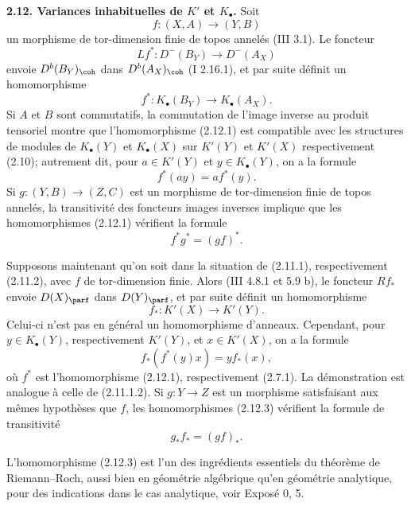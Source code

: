 \documentclass[11pt]{article}
\begin{document}
\textbf{2.12. Variances inhabituelles de \(K'\) et \(K_{\bullet}\).} Soit
\[
 f:(X,A)\longrightarrow(Y,B)
\]
un morphisme de tor-dimension finie de topos annelés (III 3.1). Le foncteur
\[
 Lf^*:D^-(B_Y)\longrightarrow D^-(A_X)
\]
envoie \(D^b(B_Y)_{\coh}\) dans \(D^b(A_X)_{\coh}\) (I 2.16.1), et par suite définit un homomorphisme
\begin{equation}\tag{2.12.1}
 f^*:K_{\bullet}(B_Y)\longrightarrow K_{\bullet}(A_X).
\end{equation}
Si \(A\) et \(B\) sont commutatifs, la commutation de l'image inverse au produit tensoriel montre que l'homomorphisme (2.12.1) est compatible avec les structures de modules de \(K_{\bullet}(Y)\) et \(K_{\bullet}(X)\) sur \(K'(Y)\) et \(K'(X)\) respectivement (2.10); autrement dit, pour \(a\in K'(Y)\) et \(y\in K_{\bullet}(Y)\), on a la formule
\begin{equation}\tag{2.12.2}
 f^*(ay)=a f^*(y).
\end{equation}
Si \(g:(Y,B)\to(Z,C)\) est un morphisme de tor-dimension finie de topos annelés, la transitivité des foncteurs images inverses implique que les homomorphismes (2.12.1) vérifient la formule
\begin{equation}\tag{2.12.1.1}
 f^*g^*=(gf)^*.
\end{equation}

Supposons maintenant qu'on soit dans la situation de (2.11.1), respectivement (2.11.2), avec \(f\) de tor-dimension finie. Alors (III 4.8.1 et 5.9 b), le foncteur \(Rf_*\) envoie \(D(X)_{\parf}\) dans \(D(Y)_{\parf}\), et par suite définit un homomorphisme
\begin{equation}\tag{2.12.3}
 f_*:K'(X)\longrightarrow K'(Y).
\end{equation}
Celui-ci n'est pas en général un homomorphisme d'anneaux. Cependant, pour \(y\in K_{\bullet}(Y)\), respectivement \(K'(Y)\), et \(x\in K'(X)\), on a la formule
\begin{equation}\tag{2.12.4}
 f_*(f^*(y)x)=y f_*(x),
\end{equation}
où \(f^*\) est l'homomorphisme (2.12.1), respectivement (2.7.1). La démonstration est analogue à celle de (2.11.1.2). Si \(g:Y\to Z\) est un morphisme satisfaisant aux mêmes hypothèses que \(f\), les homomorphismes (2.12.3) vérifient la formule de transitivité
\begin{equation}\tag{2.12.3.1}
 g_*f_*=(gf)_*.
\end{equation}

L'homomorphisme (2.12.3) est l'un des ingrédients essentiels du théorème de Riemann--Roch, aussi bien en géométrie algébrique qu'en géométrie analytique, pour des indications dans le cas analytique, voir Exposé 0, 5.
\end{document}
